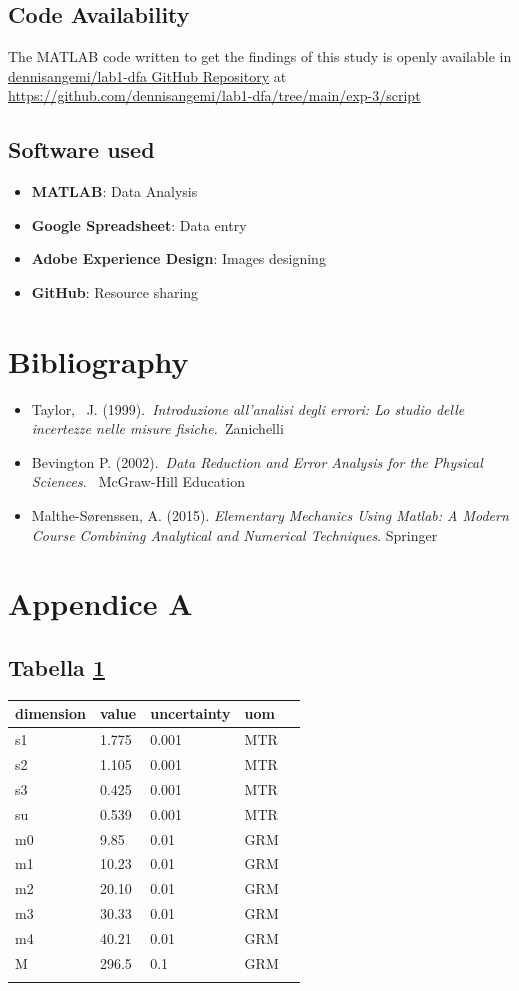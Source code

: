 \documentclass[11pt,a4paper]{article}
\begin{document}
\subsection{Code Availability}
The MATLAB code written to get the findings of this study is openly available in \href{https://github.com/dennisangemi/lab1-dfa/tree/main/exp-2/script}{dennisangemi/lab1-dfa GitHub Repository} at \href{https://github.com/dennisangemi/lab1-dfa/tree/main/exp-3/script}{https://github.com/dennisangemi/lab1-dfa/tree/main/exp-3/script}


\subsection{Software used}
\begin{itemize}
\item
  \textbf{MATLAB}: Data Analysis
\item
  \textbf{Google Spreadsheet}: Data entry
\item
  \textbf{Adobe Experience Design}: Images designing
\item
  \textbf{GitHub}: Resource sharing
\end{itemize}

\section{Bibliography}
\begin{itemize}
\item
  Taylor,~ J. (1999).~\emph{Introduzione all'analisi degli errori: Lo
  studio delle incertezze nelle misure fisiche.~}Zanichelli
\item
  Bevington P. (2002).~\emph{Data Reduction and Error Analysis for the
  Physical Sciences.~} McGraw-Hill Education ~
\item Malthe-Sørenssen, A. (2015). \emph{Elementary Mechanics Using Matlab: A Modern Course Combining Analytical and Numerical Techniques}. Springer
\end{itemize}

\section{Appendice A}
\subsection{Tabella \ref{expdata1}}

\begin{longtable}[]{@{}lllll@{}}
\toprule
dimension & value & uncertainty & uom \tabularnewline
\midrule
\endhead
s1 & 1.775 & 0.001 & MTR \tabularnewline
s2 & 1.105 & 0.001 & MTR \tabularnewline
s3 & 0.425 & 0.001 & MTR \tabularnewline
su & 0.539 & 0.001 & MTR \tabularnewline
m0 & 9.85 & 0.01 & GRM \tabularnewline
m1 & 10.23 & 0.01 & GRM \tabularnewline
m2 & 20.10 & 0.01 & GRM \tabularnewline
m3 & 30.33 & 0.01 & GRM \tabularnewline
m4 & 40.21 & 0.01 & GRM \tabularnewline
M & 296.5 & 0.1 & GRM \tabularnewline
\bottomrule
\label{expdata1}
\end{longtable}
\end{document}
